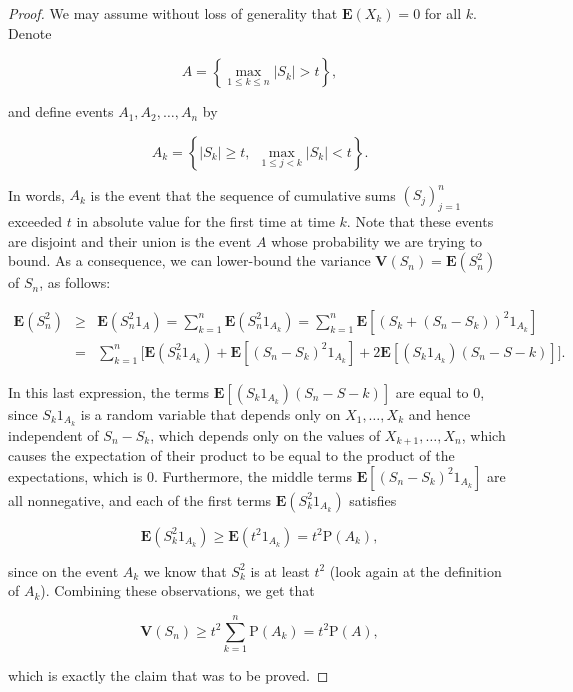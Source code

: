 \begin{proof}
We may assume without loss of generality that
$\mathbf{E}(X_k)=0$ for all $k$. Denote

\[
A = \left\{ \max_{1\le k\le n} |S_k| > t\right\},
\]

\noindent and define events $A_1,A_2,\ldots,A_n$ by

\[
A_k = \left\{ |S_k|\ge t, \ \ \max_{1\le j<k} |S_k|<t \right\}.
\]

\noindent In words, $A_k$ is the event that the sequence of
cumulative sums $(S_j)_{j=1}^n$ exceeded $t$ in
absolute value for the first time at time $k$. Note
that these events are disjoint and their union is the
event $A$ whose probability we are trying to bound.
As a consequence, we can lower-bound the variance
$\mathbf{V}(S_n)=\mathbf{E}(S_n^2)$ of $S_n$, as
follows:

\begin{eqnarray*}
\mathbf{E}(S_n^2) &\ge& \mathbf{E}(S_n^2 1_A) = \sum_{k=1}^n \mathbf{E} \left(S_n^2 1_{A_k}\right)
= \sum_{k=1}^n \mathbf{E} \left[ \left(S_k+(S_n-S_k)\right)^2 1_{A_k} \right] \\
&=&
\sum_{k=1}^n \Big[\mathbf{E} (S_k^2 1_{A_k}) + \mathbf{E}\left[ (S_n-S_k)^2 1_{A_k} \right]
+ 2 \mathbf{E} \left[(S_k 1_{A_k}) (S_n-S-k) \right] \Big].
\end{eqnarray*}

\noindent In this last expression, the terms
$\mathbf{E} \left[(S_k 1_{A_k}) (S_n-S-k) \right]$
are equal to $0$, since $S_k 1_{A_k}$ is a random
variable that depends only on $X_1,\ldots,X_k$ and
hence independent of $S_n-S_k$, which depends only on
the values of $X_{k+1},\ldots,X_n$, which causes the
expectation of their product to be equal to the
product of the expectations, which is 0. Furthermore,
the middle terms
$\mathbf{E}\left[ (S_n-S_k)^2 1_{A_k} \right]$ are
all nonnegative, and each of the first terms
$\mathbf{E} (S_k^2 1_{A_k})$ satisfies

\[
\mathbf{E} (S_k^2 1_{A_k}) \ge \mathbf{E} (t^2 1_{A_k}) = t^2 \mathrm{P}(A_k),
\]

\noindent since on the event $A_k$ we know that $S_k^2$ is at
least $t^2$ (look again at the definition of $A_k$).
Combining these observations, we get that

\[
\mathbf{V}(S_n)  \ge t^2\sum_{k=1}^n \mathrm{P}(A_k) = t^2 \mathrm{P}(A),
\]

\noindent which is exactly the claim that was to be proved.
\end{proof}

